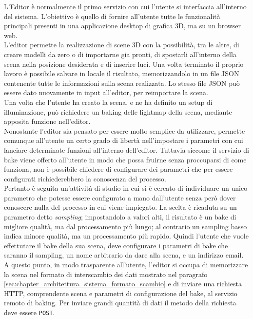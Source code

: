 L’Editor è normalmente il primo servizio con cui l’utente si interfaccia all’interno del sistema. L’obiettivo è quello di fornire all’utente tutte le funzionalità principali presenti in una applicazione desktop di grafica 3D, ma su un browser web.
\\
L’editor permette la realizzazione di scene 3D con la possibilità, tra le altre, di creare modelli da zero o di importarne gia pronti, di spostarli all'interno della scena nella posizione desiderata e di inserire luci. Una volta terminato il proprio lavoro è possibile salvare in locale il risultato, memorizzandolo in un file JSON contenente tutte le informazioni sulla scena realizzata. Lo stesso file JSON può essere dato nuovamente in input all’editor, per reimportare la scena.
\\ 
Una volta che l’utente ha creato la scena, e ne ha definito un setup di illuminazione, può richiedere un baking delle lightmap della scena, mediante apposita funzione nell’editor.
\\
Nonostante l’editor sia pensato per essere molto semplice da utilizzare, permette comunque all’utente un certo grado di libertà nell’impostare i parametri con cui lanciare determinate funzioni all’interno dell’editor. Tuttavia siccome il servizio di bake viene offerto all’utente in modo che possa fruirne senza proccuparsi di come funziona, non è possibile chiedere di configurare dei parametri che per essere configurati richiederebbero la conoscenza del processo. 
\\
Pertanto è seguita un’attività di studio in cui si è cercato di individuare un unico parametro che potesse essere configurato a mano dall’utente senza però dover conoscere nulla del processo in cui viene impiegato. La scelta è ricaduta su un parametro detto \emph{sampling}; impostandolo a valori alti, il risultato è un bake di migliore qualità, ma dal processamento più lungo; al contrario un sampling basso indica minore qualità, ma un processamento più rapido. Quindi l’utente che vuole effettutare il bake della sua scena, deve configurare i parametri di bake che saranno il sampling, un nome arbitrario da dare alla scena, e un indirizzo email.
\\
A questo punto, in modo trasparente all’utente, l’editor si occupa di memorizzare la scena nel formato di interscambio dei dati mostrato nel paragrafo \ref{sec:chapter_architettura_sistema_formato_scambio} e di inviare una richiesta HTTP, comprendente scena e parametri di configurazione del bake, al servizio remoto di baking. Per inviare grandi quantità di dati il metodo della richiesta deve essere \texttt{POST}.
